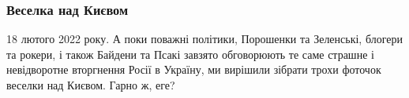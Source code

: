  
 
 
 
 
\clearpage
\subsubsection{Веселка над Києвом}
\label{sec:topics.ukraina.rossia.ugroza_napadenia.preface.2.veselka}

18 лютого 2022 року. А поки поважні політики, Порошенки та Зеленські, блогери
та рокери, і також Байдени та Псакі завзято обговорюють те саме
страшне і невідворотне вторгнення Росії в Україну, ми вирішили зібрати трохи
фоточок веселки над Києвом. Гарно ж, еге?

